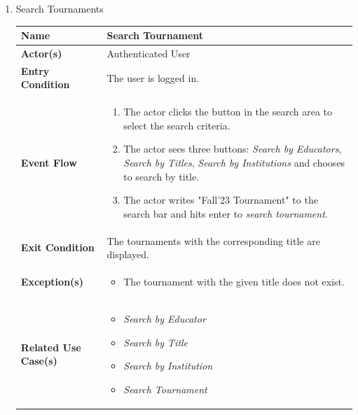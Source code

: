 \begin{enumerate}
\item Search Tournaments
\begin{center}
    \begin{tabular}{ | m{10em} | m{10cm}| } 
      \hline
      \textbf{Name} & Search Tournament  \\ 
      \hline
      \textbf{Actor(s)} & Authenticated User \\ 
      \hline
      \textbf{Entry Condition} & The user is logged in. \\ 
      \hline
      \textbf{Event Flow} & 
          \begin{enumerate}[(1)]
              \item The actor clicks the button in the search area to select the search criteria.
              \item The actor sees three buttons: \textit{Search by Educators}, \textit{Search by Titles}, \textit{Search by Institutions} and chooses to search by title.
              \item The actor writes "Fall'23 Tournament" to the search bar and hits enter to \textit{search tournament}.
          \end{enumerate}
      \\ 
      \hline
      \textbf{Exit Condition} & The tournaments with the corresponding title are displayed.  \\ 
      \hline
      \textbf{Exception(s)} & 
      \begin{itemize}
          \item The tournament with the given title does not exist.
      \end{itemize}
          \\ 
      \hline
      \textbf{Related Use Case(s)} & 
      \begin{itemize}
          \item \textit{Search by Educator}
          \item \textit{Search by Title}
          \item \textit{Search by Institution}
          \item \textit{Search Tournament}
      \end{itemize}
          \\ 
      \hline
    \end{tabular}
\end{center}



\end{enumerate}
